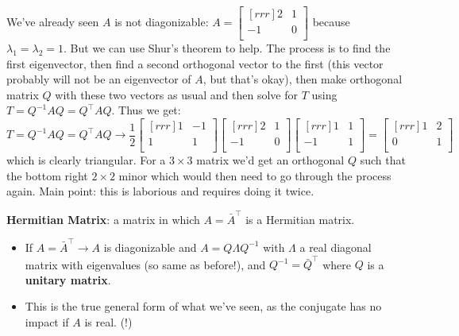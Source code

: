 \begin{example}
    We've already seen $A$ is not diagonizable: $A=\begin{bmatrix}[rrr]
     2 & 1 \\
     -1 & 0 \\
   \end{bmatrix}$ because $\lambda_1 = \lambda_2=1$. But we can use Shur's theorem to help. The process is to find the first eigenvector, then find a second orthogonal vector to the first (this vector probably will not be an eigenvector of $A$, but that's okay), then make orthogonal matrix $Q$ with these two vectors as usual and then solve for $T$ using $T=Q^{-1}AQ=Q^{\intercal}AQ$. Thus we get:
   \[ T=Q^{-1}AQ=Q^{\intercal}AQ \rightarrow \frac{1}{2}
   \begin{bmatrix}[rrr]
    1 & -1 \\
    1 & 1 \\
  \end{bmatrix}
  \begin{bmatrix}[rrr]
   2 & 1 \\
   -1 & 0 \\
 \end{bmatrix}
 \begin{bmatrix}[rrr]
  1 & 1 \\
  -1 & 1 \\
\end{bmatrix}
  =  \begin{bmatrix}[rrr]
    1 & 2 \\
    0 & 1 \\
\end{bmatrix} \]
which is clearly triangular.
  For a $3 \times 3$ matrix we'd get an orthogonal $Q$ such that the bottom right $2 \times 2$ minor which would then need to go through the process again. Main point: this is laborious and requires doing it twice.
\end{example}

\begin{definition}
    \textbf{Hermitian Matrix}: a matrix in which $A=\bar{A}^\intercal$ is a Hermitian matrix.
    \begin{itemize}
        \item If $A=\bar{A}^\intercal \rightarrow A$ is diagonizable and $A=Q\Lambda Q^{-1}$ with $\Lambda$ a real diagonal matrix with eigenvalues (so same as before!), and $Q^{-1}=\bar{Q}^\intercal$ where $Q$ is a \textbf{unitary matrix}.
        \item This is the true general form of what we've seen, as the conjugate has no impact if $A$ is real. (!)
    \end{itemize}
\end{definition}

